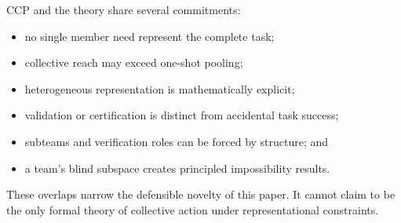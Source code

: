 
CCP and the theory share several commitments:
\begin{itemize}
\item no single member need represent the complete task;
\item collective reach may exceed one-shot pooling;
\item heterogeneous representation is mathematically explicit;
\item validation or certification is distinct from accidental task success;
\item subteams and verification roles can be forced by structure; and
\item a team's blind subspace creates principled impossibility results.
\end{itemize}
These overlaps narrow the defensible novelty of this paper. It
cannot claim to be the only formal theory of collective action under
representational constraints.


